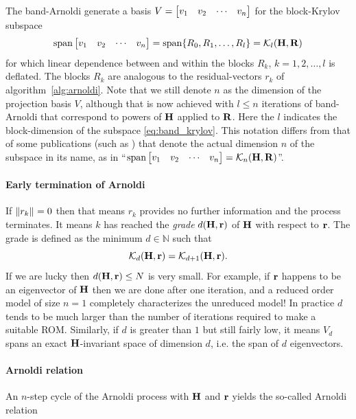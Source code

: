 The band-Arnoldi generate a basis $V=\begin{bmatrix} v_1 & v_2 &  \cdots & v_n\end{bmatrix}$ for the block-Krylov subspace
\begin{equation}
\operatorname*{span} \begin{bmatrix} v_1&v_2&\cdots&v_n\end{bmatrix}
=  \operatorname*{span}\{R_0 , R_1,\ldots, R_l \} 
= \mathcal{K}_{l}({\textbf{\textup{H}}},{\textbf{\textup{R}}})
\label{eq:band_krylov}
\end{equation}
for which  linear dependence between and within the blocks $R_k$, $k=1,2,\ldots,l$ is  deflated.    The blocks $R_k$ are analogous to the residual-vectors $r_k$ of algorithm~\ref{alg:arnoldi}.  Note that we still denote $n$ as the dimension of the projection basis $V$, although that is now achieved with $l\leq n$ iterations of band-Arnoldi that correspond to powers of $\textbf{\textup{H}}$ applied to $\textbf{\textup{R}}$.   Here the $l$ indicates the block-dimension of the subspace \eqref{eq:band_krylov}.  This notation differs from that of some publications (such as  \cite{AN,freund2000b}) that denote the actual dimension $n$ of the subspace in its name, as in ``$\operatorname*{span}\begin{bmatrix} v_1&v_2&\cdots&v_n\end{bmatrix}=\mathcal{K}_{n}({\textbf{\textup{H}}},{\textbf{\textup{R}}})$''. 






\paragraph{Early termination of Arnoldi}
If $\left\| r_k \right\|_{}=0$ then that means $r_k$ provides no further information and the process terminates.  It means $k$ has reached the \emph{grade} $d(\textbf{\textup{H}},\textbf{\textup{r}})$ of  $\textbf{\textup{H}}$ with respect to $\textbf{\textup{r}}$.  The grade is defined as the minimum $d\in\mathbb{N}$ such that 
\[
\mathcal{K}_{d}({\textbf{\textup{H}}},{\textbf{\textup{r}}}) = \mathcal{K}_{d+1}({\textbf{\textup{H}}},{\textbf{\textup{r}}}).
\] 
If we are lucky then $d(\textbf{\textup{H}},\textbf{\textup{r}})\leq N$ is very small.  For example, if $\textbf{\textup{r}}$ happens to be an eigenvector of $\textbf{\textup{H}}$ then we are done after one iteration, and a reduced order model of size $n=1$ completely characterizes the unreduced model!  In practice $d$ tends to be much larger than the number of iterations required to make a suitable ROM.   Similarly, if $d$ is greater than $1$ but still fairly low, it means $V_d$ spans an exact $\textbf{\textup{H}}$-invariant space of dimension $d$, i.e. the span of  $d$ eigenvectors.

 
\paragraph{Arnoldi relation}
   An $n$-step cycle of the Arnoldi process with $\textbf{\textup{H}}$ and $\textbf{\textup{r}}$ yields the so-called Arnoldi relation
   
